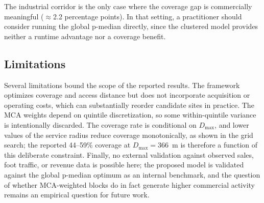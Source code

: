 The industrial corridor is the only case where the coverage gap is
commercially meaningful ($\approx$2.2 percentage points).
In that setting, a practitioner should consider running the global
\mbox{p-median} directly, since the clustered model provides neither
a runtime advantage nor a coverage benefit.

\subsection{Limitations}

Several limitations bound the scope of the reported results.
The framework optimizes coverage and access distance but does not
incorporate acquisition or operating costs, which can substantially
reorder candidate sites in practice.
The MCA weights depend on quintile discretization, so some within-quintile
variance is intentionally discarded.
The coverage rate is conditional on $D_{\max}$, and lower values
of the service radius reduce coverage monotonically, as shown
in the grid search; the reported 44--59\% coverage at $D_{\max} = 366$~m
is therefore a function of this deliberate constraint.
Finally, no external validation against observed sales, foot traffic,
or revenue data is possible here; the proposed model is validated against
the global \mbox{p-median} optimum as an internal benchmark, and the
question of whether MCA-weighted blocks do in fact generate higher
commercial activity remains an empirical question for future work.
